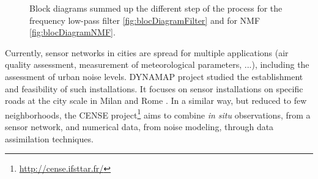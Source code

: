 \documentclass[twocolumn,a4paper,10pt]{article}
\begin{document}
\begin{figure}
    \centering
    \caption{Block diagrams summed up the different step of the process for the frequency low-pass filter \ref{fig:blocDiagramFilter} and for NMF \ref{fig:blocDiagramNMF}.}
    \label{fig:blocDiagram}
\end{figure}

Currently, sensor networks in cities are spread for multiple applications (air quality assessment, measurement of meteorological parameters, ...), including the assessment of urban noise levels. DYNAMAP project \cite{dynamap_2016} studied the establishment and feasibility of such installations. It focuses on sensor installations on specific roads at the city scale in Milan and Rome \cite{bellucci_life_2017}. In a similar way, but reduced to few neighborhoods, the CENSE project\footnote{\url{http://cense.ifsttar.fr/}} \cite{} aims to combine \textit{in situ} observations, from a sensor network, and numerical data, from noise modeling, through data assimilation techniques.
\end{document}

